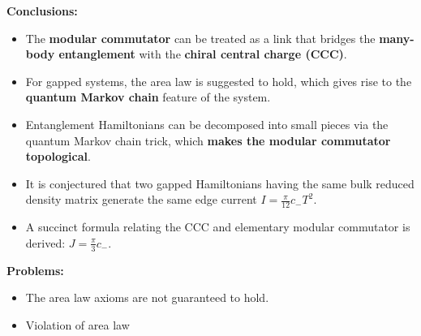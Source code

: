 \documentclass[professionalfont]{beamer}
\begin{document}
\begin{frame}

\textbf{Conclusions:}
\begin{itemize}
    \item The \textbf{modular commutator} can be treated as a link that bridges the \textbf{many-body entanglement} with the \textbf{chiral central charge (CCC)}.
 
    \item For gapped systems, the area law is suggested to hold, which gives rise to the \textbf{quantum Markov chain} feature of the system.
 
    \item Entanglement Hamiltonians can be decomposed into small pieces via the quantum Markov chain trick, which \textbf{makes the modular commutator topological}.
 
    \item It is conjectured that two gapped Hamiltonians having the same bulk reduced density matrix generate the same edge current $I = \frac{\pi}{12}c_- T^2$.
 
    \item A succinct formula relating the CCC and elementary modular commutator is derived: $J = \frac{\pi}{3}c_-$.
\end{itemize}
 
\textbf{Problems:}
\begin{itemize}
    \item The area law axioms are not guaranteed to hold.
    
    \item Violation of area law
\end{itemize}


    
\end{frame}
\end{document}
